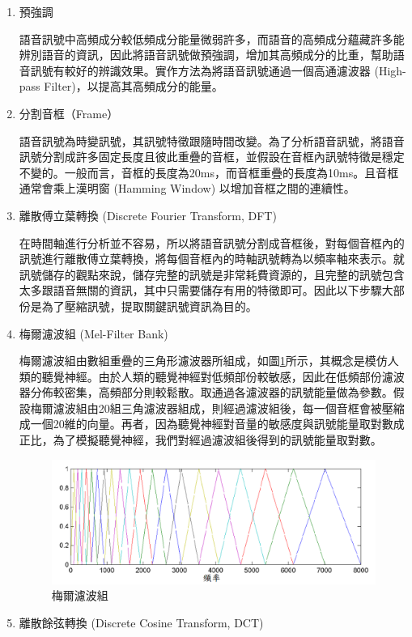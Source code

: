 \begin{enumerate}
	\item 預強調

		語音訊號中高頻成分較低頻成分能量微弱許多，而語音的高頻成分蘊藏許多能辨別語音的資訊，因此將語音訊號做預強調，增加其高頻成分的比重，幫助語音訊號有較好的辨識效果。實作方法為將語音訊號通過一個高通濾波器
		(High-pass Filter)，以提高其高頻成分的能量。
	\item 分割音框（Frame）
		
		語音訊號為時變訊號，其訊號特徵跟隨時間改變。為了分析語音訊號，將語音訊號分割成許多固定長度且彼此重疊的音框，並假設在音框內訊號特徵是穩定不變的。一般而言，音框的長度為20ms，而音框重疊的長度為10ms。且音框通常會乘上漢明窗 (Hamming Window) 以增加音框之間的連續性。
	\item 離散傅立葉轉換 (Discrete Fourier Transform, DFT)
		
		在時間軸進行分析並不容易，所以將語音訊號分割成音框後，對每個音框內的訊號進行離散傅立葉轉換，將每個音框內的時軸訊號轉為以頻率軸來表示。就訊號儲存的觀點來說，儲存完整的訊號是非常耗費資源的，且完整的訊號包含太多跟語音無關的資訊，其中只需要儲存有用的特徵即可。因此以下步驟大部份是為了壓縮訊號，提取關鍵訊號資訊為目的。
	\item 梅爾濾波組 (Mel-Filter Bank)
		
		梅爾濾波組由數組重疊的三角形濾波器所組成，如圖\ref{ch3_mel_filter}所示，其概念是模仿人類的聽覺神經。由於人類的聽覺神經對低頻部份較敏感，因此在低頻部份濾波器分佈較密集，高頻部分則較鬆散。取通過各濾波器的訊號能量做為參數。假設梅爾濾波組由20組三角濾波器組成，則經過濾波組後，每一個音框會被壓縮成一個20維的向量。再者，因為聽覺神經對音量的敏感度與訊號能量取對數成正比，為了模擬聽覺神經，我們對經過濾波組後得到的訊號能量取對數。

\begin{figure}[h]
\centering
\includegraphics[scale=0.5]{images/ch3_mel_filter.png} 
\caption{梅爾濾波組}
\label{ch3_mel_filter}
\end{figure}
	\item 離散餘弦轉換 (Discrete Cosine Transform, DCT)
		

\end{enumerate}

